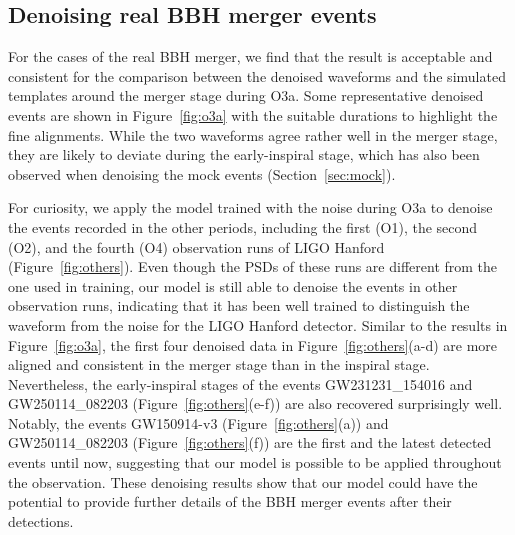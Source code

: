 \documentclass[preprint,12pt]{elsarticle}
\begin{document}
\subsection{Denoising real BBH merger events}
For the cases of the real BBH merger, we find that the result is acceptable and consistent for the comparison between the denoised waveforms and the simulated templates around the merger stage during O3a.
Some representative denoised events are shown in Figure~\ref{fig:o3a} with the suitable durations to highlight the fine alignments.
While the two waveforms agree rather well in the merger stage, they are likely to deviate during the early-inspiral stage, which has also been observed when denoising the mock events (Section~\ref{sec:mock}).

For curiosity, we apply the model trained with the noise during O3a to denoise the events recorded in the other periods, including the first (O1), the second (O2), and the fourth (O4) observation runs of LIGO Hanford (Figure~\ref{fig:others}).
Even though the PSDs of these runs are different from the one used in training, our model is still able to denoise the events in other observation runs, indicating that it has been well trained to distinguish the waveform from the noise for the LIGO Hanford detector. 
Similar to the results in Figure~\ref{fig:o3a}, the first four denoised data in Figure~\ref{fig:others}(a-d) are more aligned and consistent in the merger stage than in the inspiral stage.
Nevertheless, the early-inspiral stages of the events GW231231\_154016 and GW250114\_082203 (Figure~\ref{fig:others}(e-f)) are also recovered surprisingly well.
Notably, the events GW150914-v3 (Figure~\ref{fig:others}(a)) and GW250114\_082203 (Figure~\ref{fig:others}(f)) are the first and the latest detected events until now, suggesting that our model is possible to be applied throughout the observation.
These denoising results show that our model could have the potential to provide further details of the BBH merger events after their detections.

\end{document}
